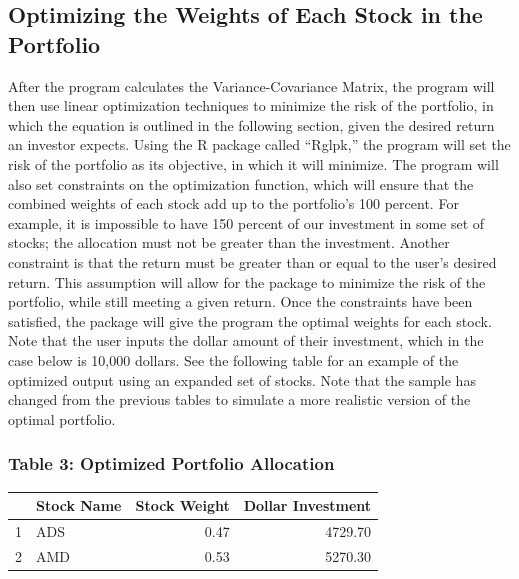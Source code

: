 \documentclass[12pt,english]{article}
\begin{document}
\begin{doublespace}
        \subsection{Optimizing the Weights of Each Stock in the Portfolio}
        
            \indent{}\indent{}
            After the program calculates the Variance-Covariance Matrix, the program will then use linear optimization techniques to minimize the risk of the portfolio, in which the equation is outlined in the following section, given the desired return an investor expects. Using the R package called “Rglpk,” the program will set the risk of the portfolio as its objective, in which it will minimize. The program will also set constraints on the optimization function, which will ensure that the combined weights of each stock add up to the portfolio’s 100 percent. For example, it is impossible to have 150 percent of our investment in some set of stocks; the allocation must not be greater than the investment. Another constraint is that the return must be greater than or equal to the user’s desired return. This assumption will allow for the package to minimize the risk of the portfolio, while still meeting a given return. Once the constraints have been satisfied, the package will give the program the optimal weights for each stock. Note that the user inputs the dollar amount of their investment, which in the case below is 10,000 dollars. See the following table for an example of the optimized output using an expanded set of stocks. Note that the sample has changed from the previous tables to simulate a more realistic version of the optimal portfolio.
            
            \subsubsection{Table 3: Optimized Portfolio Allocation}
                \begin{table}[H]
                \centering
                \begin{tabular}{rlrr}
                  \hline
                 & Stock Name & Stock Weight & Dollar Investment \\ 
                  \hline
                1 & ADS & 0.47 & 4729.70 \\ 
                  2 & AMD & 0.53 & 5270.30 \\ 
                   \hline
                \end{tabular}
                \end{table}
                

\end{doublespace}
\end{document}
